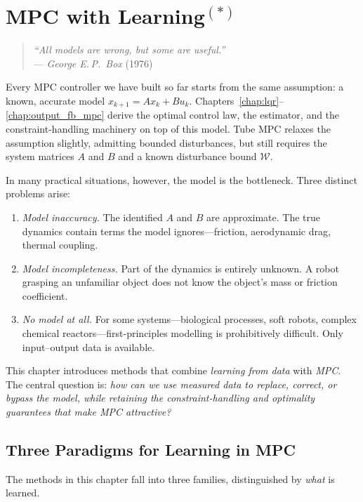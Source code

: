 \chapter{MPC with Learning\texorpdfstring{$^{(*)}$}{(*)}}
\label{chap:learning_mpc}

\begin{quote}
	\textit{``All models are wrong, but some are useful.''} \\
	\hfill --- \emph{George E.\,P.\ Box} (1976)
\end{quote}

Every MPC controller we have built so far starts from the same assumption: a known, accurate model $x_{k+1} = Ax_k + Bu_k$. Chapters~\ref{chap:lqr}--\ref{chap:output_fb_mpc} derive the optimal control law, the estimator, and the constraint-handling machinery on top of this model. Tube MPC relaxes the assumption slightly, admitting bounded disturbances, but still requires the system matrices $A$ and $B$ and a known disturbance bound $\mathcal{W}$.

In many practical situations, however, the model is the bottleneck. Three distinct problems arise:
\begin{enumerate}
	\item \emph{Model inaccuracy.} The identified $A$ and $B$ are approximate. The true dynamics contain terms the model ignores---friction, aerodynamic drag, thermal coupling.
	\item \emph{Model incompleteness.} Part of the dynamics is entirely unknown. A robot grasping an unfamiliar object does not know the object's mass or friction coefficient.
	\item \emph{No model at all.} For some systems---biological processes, soft robots, complex chemical reactors---first-principles modelling is prohibitively difficult. Only input--output data is available.
\end{enumerate}

This chapter introduces methods that combine \emph{learning from data} with \emph{MPC}. The central question is: \emph{how can we use measured data to replace, correct, or bypass the model, while retaining the constraint-handling and optimality guarantees that make MPC attractive?}

\section{Three Paradigms for Learning in MPC}
\label{sec:learning_paradigms}

The methods in this chapter fall into three families, distinguished by \emph{what} is learned.

